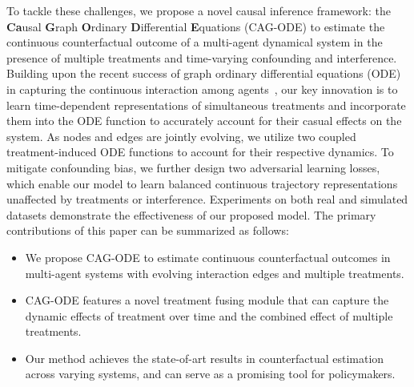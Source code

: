 To tackle these challenges, we propose a novel causal inference framework: the \textbf{Ca}usal \textbf{G}raph \textbf{O}rdinary \textbf{D}ifferential \textbf{E}quations (CAG-ODE) to estimate the continuous counterfactual outcome of a multi-agent dynamical system in the presence of multiple treatments and time-varying confounding and interference. Building upon the recent success of graph ordinary differential equations (ODE) in capturing the continuous interaction among agents~\cite{huang2021coupled,luo2023care,LG-ODE,huang2024tango}, our key innovation is to learn time-dependent representations of simultaneous treatments and incorporate them into the ODE function to accurately account for their casual effects on the system. As nodes and edges are jointly evolving, we utilize two coupled treatment-induced ODE functions to account for their respective dynamics. To mitigate confounding bias, we further design two adversarial learning losses, which enable our model to learn balanced continuous trajectory representations unaffected by treatments or interference. Experiments on both real and simulated datasets demonstrate the effectiveness of our proposed model. The primary contributions of this paper can be summarized as follows:
\begin{itemize}
    \item We propose CAG-ODE to estimate continuous counterfactual outcomes in multi-agent systems with evolving interaction edges and multiple treatments.
    \item CAG-ODE features a novel treatment fusing module that can capture the dynamic effects of treatment over time and the combined effect of multiple treatments.
    \item Our method achieves the state-of-art results in counterfactual estimation across varying systems, and can serve as a promising tool for policymakers.
\end{itemize}
